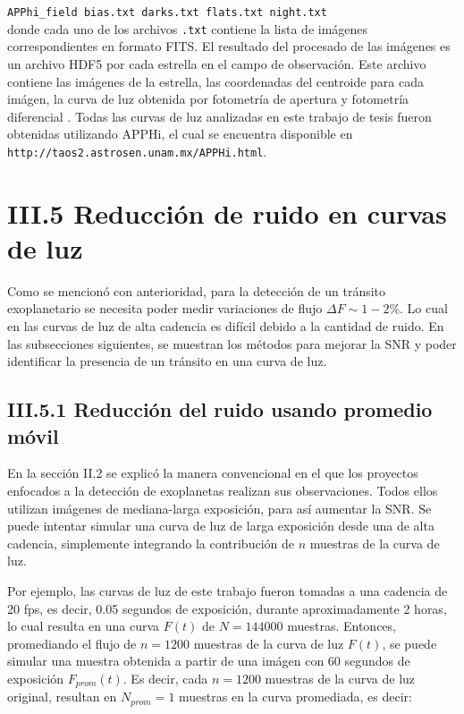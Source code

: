 \texttt{APPhi\_field bias.txt darks.txt flats.txt night.txt}\\

\noindent donde cada uno de los archivos \texttt{.txt} contiene la lista de imágenes correspondientes en formato FITS. El resultado del procesado de las imágenes es un archivo HDF5 por cada estrella en el campo de observación. Este archivo contiene las imágenes de la estrella, las coordenadas del centroide para cada imágen, la curva de luz obtenida por fotometría de apertura y fotometría diferencial \cite{sanchez2019apphi}. Todas las curvas de luz analizadas en este trabajo de tesis fueron obtenidas utilizando APPHi, el cual se encuentra disponible en \texttt{http://taos2.astrosen.unam.mx/APPHi.html}.

\section*{III.5 Reducción de ruido en curvas de luz}

Como se mencionó con anterioridad, para la detección de un tránsito exoplanetario se necesita poder medir variaciones de flujo $\Delta F \sim 1-2\%$. Lo cual en las curvas de luz de alta cadencia es difícil debido a la cantidad de ruido. En las subsecciones siguientes, se muestran los métodos para mejorar la SNR y poder identificar la presencia de un tránsito en una curva de luz.

\subsection*{III.5.1 Reducción del ruido usando promedio móvil}

En la sección II.2 se explicó la manera convencional en el que los proyectos enfocados a la detección de exoplanetas realizan sus observaciones. Todos ellos utilizan imágenes de mediana-larga exposición, para así aumentar la SNR. Se puede intentar simular una curva de luz de larga exposición desde una de alta cadencia, simplemente integrando la contribución de $n$ muestras de la curva de luz. 

Por ejemplo, las curvas de luz de este trabajo fueron tomadas a una cadencia de 20 fps, es decir, 0.05 segundos de exposición, durante aproximadamente 2 horas, lo cual resulta en una curva $F(t)$ de $N=144000$ muestras. Entonces, promediando el flujo de $n=1200$ muestras de la curva de luz $F(t)$, se puede simular una muestra obtenida a partir de una imágen con 60 segundos de exposición $F_{prom}(t)$. Es decir, cada $n=1200$ muestras de la curva de luz original, resultan en $N_{prom}=1$ muestras en la curva promediada, es decir:

